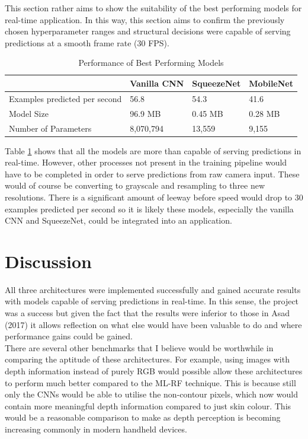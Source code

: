\documentclass{article}
\begin{document}
{This section rather aims to show the suitability of the best performing models for real-time application. In this way, this section aims to confirm the previously chosen hyperparameter ranges and structural decisions were capable of serving predictions at a smooth frame rate (30 FPS).\\

\begin{table}[h!]
  \begin{center}
    \caption{Performance of Best Performing Models}
    \label{tab:speed}
    \begin{tabular}{l|l|l|l}
      \textbf{} & \textbf{Vanilla CNN} &  \textbf{SqueezeNet} & \textbf{MobileNet}  \\
      \hline
      Examples predicted per second & 56.8 & 54.3 & 41.6 \\
      Model Size & 96.9 MB  & 0.45 MB & 0.28 MB \\
      Number of Parameters & 8,070,794 & 13,559 & 9,155\\
    \end{tabular}
  \end{center}
\end{table}

Table \ref{tab:speed} shows that all the models are more than capable of serving predictions in real-time. However, other processes not present in the training pipeline would have to be completed in order to serve predictions from raw camera input. These would of course be converting to grayscale and resampling to three new resolutions. There is a significant amount of leeway before speed would drop to 30 examples predicted per second so it is likely these models, especially the vanilla CNN and SqueezeNet, could be integrated into an application.

\section{Discussion}
All three architectures were implemented successfully and gained accurate results with models capable of serving predictions in real-time. In this sense, the project was a success but given the fact that the results were inferior to those in Asad (2017) it allows reflection on what else would have been valuable to do and where performance gains could be gained. \\

There are several other benchmarks that I believe would be worthwhile in comparing the aptitude of these architectures. For example, using images with depth information instead of purely RGB would possible allow these architectures to perform much better compared to the ML-RF technique. This is because still only the CNNs would be able to utilise the non-contour pixels, which now would contain more meaningful depth information compared to just skin colour. This would be a reasonable comparison to make as depth perception is becoming increasing commonly in modern handheld devices. \\

}
\end{document}
